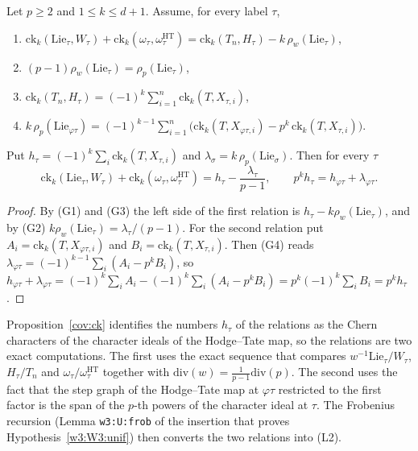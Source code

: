 \begin{proposition}\label{cov:ck}
Let $p\ge2$ and $1\le k\le d+1$. Assume, for every label $\tau$,
\begin{enumerate}
\item[(G1)] $\mathrm{ck}_k(\mathrm{Lie}_\tau,W_\tau)+\mathrm{ck}_k(\omega_\tau,\omega^{\mathrm{HT}}_\tau)=\mathrm{ck}_k(T_n,H_\tau)-k\,\rho_w(\mathrm{Lie}_\tau)$,
\item[(G2)] $(p-1)\rho_w(\mathrm{Lie}_\tau)=\rho_p(\mathrm{Lie}_\tau)$,
\item[(G3)] $\mathrm{ck}_k(T_n,H_\tau)=(-1)^k\sum_{i=1}^n\mathrm{ck}_k(T,X_{\tau,i})$,
\item[(G4)] $k\,\rho_p(\mathrm{Lie}_{\varphi\tau})=(-1)^{k-1}\sum_{i=1}^n\big(\mathrm{ck}_k(T,X_{\varphi\tau,i})-p^k\,\mathrm{ck}_k(T,X_{\tau,i})\big)$.
\end{enumerate}
Put $h_\tau=(-1)^k\sum_i\mathrm{ck}_k(T,X_{\tau,i})$ and $\lambda_\sigma=k\,\rho_p(\mathrm{Lie}_\sigma)$. Then for every $\tau$
\[
\mathrm{ck}_k(\mathrm{Lie}_\tau,W_\tau)+\mathrm{ck}_k(\omega_\tau,\omega^{\mathrm{HT}}_\tau)=h_\tau-\frac{\lambda_\tau}{p-1},\qquad p^kh_\tau=h_{\varphi\tau}+\lambda_{\varphi\tau}.
\]
\end{proposition}

\begin{proof}
By (G1) and (G3) the left side of the first relation is $h_\tau-k\rho_w(\mathrm{Lie}_\tau)$, and by (G2) $k\rho_w(\mathrm{Lie}_\tau)=\lambda_\tau/(p-1)$. For the second relation put $A_i=\mathrm{ck}_k(T,X_{\varphi\tau,i})$ and $B_i=\mathrm{ck}_k(T,X_{\tau,i})$. Then (G4) reads $\lambda_{\varphi\tau}=(-1)^{k-1}\sum_i(A_i-p^kB_i)$, so $h_{\varphi\tau}+\lambda_{\varphi\tau}=(-1)^k\sum_iA_i-(-1)^k\sum_i(A_i-p^kB_i)=p^k(-1)^k\sum_iB_i=p^kh_\tau$.
\end{proof}

Proposition~\ref{cov:ck} identifies the numbers $h_\tau$ of the relations as the Chern characters of the character ideals of the Hodge--Tate map, so the relations are two exact computations. The first uses the exact sequence that compares $w^{-1}\mathrm{Lie}_\tau/W_\tau$, $H_\tau/T_n$ and $\omega_\tau/\omega^{\mathrm{HT}}_\tau$ together with $\mathrm{div}(w)=\frac1{p-1}\mathrm{div}(p)$. The second uses the fact that the step graph of the Hodge--Tate map at $\varphi\tau$ restricted to the first factor is the span of the $p$-th powers of the character ideal at $\tau$. The Frobenius recursion (Lemma \texttt{w3:U:frob} of the insertion that proves Hypothesis~\ref{w3:W3:unif}) then converts the two relations into (L2). 



